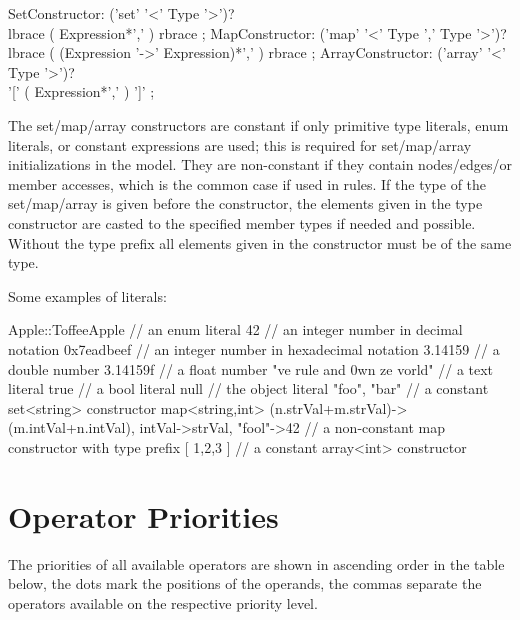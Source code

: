 \begin{rail}
  SetConstructor: ('set' '<' Type '>')? \\ lbrace ( Expression*',' ) rbrace ;
  MapConstructor: ('map' '<' Type ',' Type '>')? \\ lbrace ( (Expression '->' Expression)*',' ) rbrace ;
  ArrayConstructor: ('array' '<' Type '>')? \\ '[' ( Expression*',' ) ']' ;
\end{rail}

The set/map/array constructors are constant if only primitive type literals, enum literals, or constant expressions are used; this is required for set/map/array initializations in the model.
They are non-constant if they contain nodes/edges/or member accesses, which is the common case if used in rules.
If the type of the set/map/array is given before the constructor, the elements given in the type constructor are casted to the specified member types if needed and possible.
Without the type prefix all elements given in the constructor must be of the same type.

\begin{example}
Some examples of literals:
\begin{grgen}
Apple::ToffeeApple // an enum literal
42 // an integer number in decimal notation
0x7eadbeef // an integer number in hexadecimal notation
3.14159 // a double number
3.14159f // a float number
"ve rule and 0wn ze vorld" // a text literal
true // a bool literal
null // the object literal
{ "foo", "bar" } // a constant set<string> constructor
map<string,int>{ (n.strVal+m.strVal)->(m.intVal+n.intVal), intVal->strVal, "fool"->42 } // a non-constant map constructor with type prefix
[ 1,2,3 ] // a constant array<int> constructor
\end{grgen}
\end{example}


\section{Operator Priorities}

The priorities of all available operators are shown in ascending order in the table below, the dots mark the positions of the operands, the commas separate the operators available on the respective priority level.

